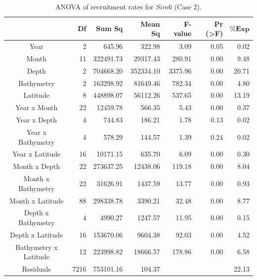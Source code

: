 \begin{table}[H]
\centering
\begin{adjustbox}{width=0.9\textwidth}
\small
\begin{tabular}{c|r|r|r|r|r|r}
\hline
                                  &
	\textbf{Df}                   &
	\textbf{Sum Sq}               &
	\textbf{Mean Sq}              &
	\textbf{F-value}    		   &
	\textbf{Pr (\textgreater{F})} &
	$\mathbf{\% Exp}$      \\
\hline
Year                  & 2    & 645.96    & 322.98    & 3.09    & 0.05                & 0.02  \\
Month                 & 11   & 322491.73 & 29317.43  & 280.91  & 0.00                & 9.48  \\
Depth                 & 2    & 704668.20 & 352334.10 & 3375.96 & 0.00                & 20.71 \\
Bathymetry            & 2    & 163298.92 & 81649.46  & 782.34  & 0.00                & 4.80  \\
Latitude              & 8    & 448898.07 & 56112.26  & 537.65  & 0.00                & 13.19 \\
Year x Month          & 22   & 12459.78  & 566.35    & 5.43    & 0.00                & 0.37  \\
Year x Depth          & 4    & 744.83    & 186.21    & 1.78    & 0.13                & 0.02  \\
Year x Bathymetry     & 4    & 578.29    & 144.57    & 1.39    & 0.24                & 0.02  \\
Year x Latitude       & 16   & 10171.15  & 635.70    & 6.09    & 0.00                & 0.30  \\
Month x Depth         & 22   & 273637.25 & 12438.06  & 119.18  & 0.00                & 8.04  \\
Month x Bathymetry    & 22   & 31626.91  & 1437.59   & 13.77   & 0.00                & 0.93  \\
Month x Latitude      & 88   & 298338.78 & 3390.21   & 32.48   & 0.00                & 8.77  \\
Depth x Bathymetry    & 4    & 4990.27   & 1247.57   & 11.95   & 0.00                & 0.15  \\
Depth x Latitude      & 16   & 153670.06 & 9604.38   & 92.03   & 0.00                & 4.52  \\
Bathymetry x Latitude & 12   & 223998.82 & 18666.57  & 178.86  & 0.00                & 6.58  \\
Residuals             & 7216 & 753101.16 & 104.37    &         &                     & 22.13 \\
\hline
\end{tabular}
\end{adjustbox}
\caption{ANOVA of recruitment rates for $Sim 6$ (Case 2).}
\label{ANOVAsim6}
\end{table}

